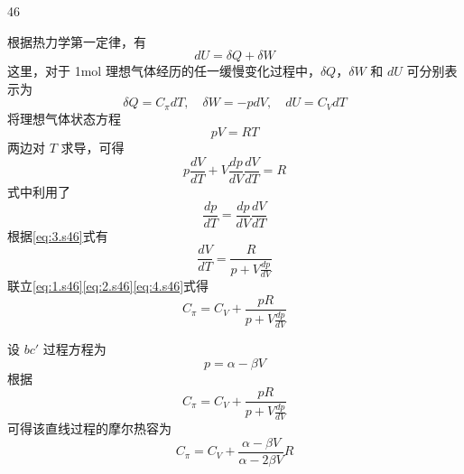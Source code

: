 \begin{solution}{46}
    \begin{subsolution}
        根据热力学第一定律，有
        \begin{equation}
            dU = \delta Q + \delta W
            \label{eq:1.s46}
        \end{equation}
        这里，对于 1mol 理想气体经历的任一缓慢变化过程中，$\delta Q$，$\delta W$ 和 $dU$ 可分别表示为
        \begin{equation}
            \delta Q = C_{\pi} dT,\quad \delta W = -p dV,\quad dU = C_{V} dT
            \label{eq:2.s46}
        \end{equation}
        将理想气体状态方程
        \begin{equation*}
            pV = RT
        \end{equation*}
        两边对 $T$ 求导，可得
        \begin{equation}
            p\frac{dV}{dT} + V\frac{dp}{dV}\frac{dV}{dT} = R
            \label{eq:3.s46}
        \end{equation}
        式中利用了
        \begin{equation*}
            \frac{dp}{dT} = \frac{dp}{dV}\frac{dV}{dT}
        \end{equation*}
        根据\eqref{eq:3.s46}式有
        \begin{equation}
            \frac{dV}{dT} = \frac{R}{p + V\frac{dp}{dV}}
            \label{eq:4.s46}
        \end{equation}
        联立\eqref{eq:1.s46}\eqref{eq:2.s46}\eqref{eq:4.s46}式得
        \begin{equation}
            C_{\pi} = C_{V} + \frac{pR}{p + V\frac{dp}{dV}}
            \label{eq:5.s46}
        \end{equation}
    \end{subsolution}
    \begin{subsolution}
        设 $bc'$ 过程方程为
        \begin{equation}
            p = \alpha - \beta V
            \label{eq:6.s46}
        \end{equation}
        根据
        \begin{equation*}
            C_{\pi} = C_{V} + \frac{pR}{p + V\frac{dp}{dV}}
        \end{equation*}
        可得该直线过程的摩尔热容为
        \begin{equation}
            C_{\pi} = C_{V} + \frac{\alpha - \beta V}{\alpha - 2\beta V}R
            \label{eq:7.s46}
        \end{equation}

\end{subsolution}
\end{solution}
